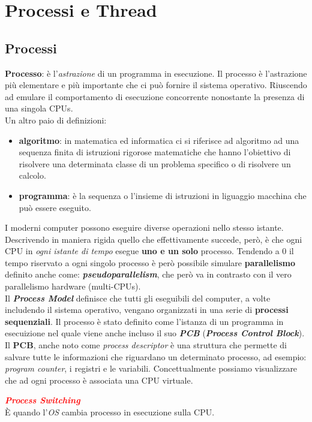 \chapter{Processi e Thread}

\section{Processi}

\textbf{Processo}: è l'\textit{astrazione} di un programma in esecuzione. Il processo è l'astrazione più elementare e più importante che ci può fornire il sistema operativo. Riuscendo ad emulare il comportamento di esecuzione concorrente nonostante la presenza di una singola CPUs. \\
Un altro paio di definizioni:
\begin{itemize}[nosep]
    \item \textbf{algoritmo}: in matematica ed informatica ci si riferisce ad algoritmo ad una sequenza finita di istruzioni rigorose matematiche che hanno l'obiettivo di risolvere una determinata classe di un problema specifico o di risolvere un calcolo.
    \item \textbf{programma}: è la sequenza o l'insieme di istruzioni in liguaggio macchina che può essere eseguito.
\end{itemize}
I moderni computer possono eseguire diverse operazioni nello stesso istante. Descrivendo in maniera rigida quello che effettivamente succede, però, è che ogni CPU in \textit{ogni istante di tempo} esegue \textbf{uno e un solo} processo. Tendendo a 0 il tempo riservato a ogni singolo processo è però possibile simulare \textbf{parallelismo} definito anche come: \textbf{\textit{pseudoparallelism}}, che però va in contrasto con il vero parallelismo hardware (multi-CPUs). \\
Il \textbf{\textit{Process Model}} definisce che tutti gli eseguibili del computer, a volte includendo il sistema operativo, vengano organizzati in una serie di \textbf{processi sequenziali}. Il processo è stato definito come l'istanza di un programma in esecuizione nel quale viene anche incluso il suo \textbf{\textit{PCB}} (\textbf{\textit{Process Control Block}}). Il \textbf{PCB}, anche noto come \textit{process descriptor} è una struttura che permette di salvare tutte le informazioni che riguardano un determinato processo, ad esempio: \textit{program counter}, i registri e le variabili. Concettualmente possiamo visualizzare che ad ogni processo è associata una CPU virtuale.
\begin{boxA}
    \textcolor{red}{\textbf{\textit{Process Switching}}} \\
    È quando l'\textit{OS} cambia processo in esecuzione sulla CPU. 
\end{boxA}

